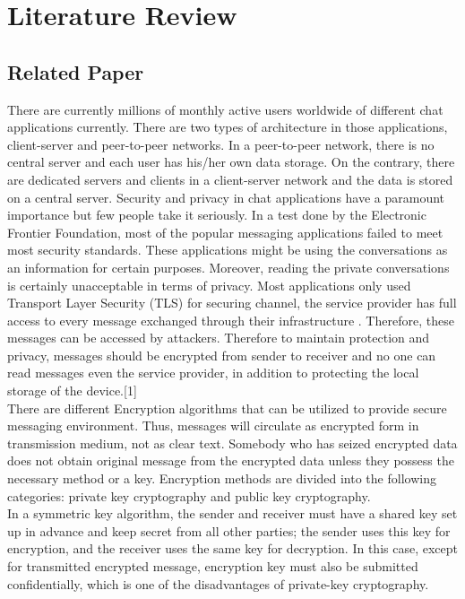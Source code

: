 \chapter{Literature Review}
\section{Related Paper}
There are currently millions of monthly active users worldwide of different chat applications currently. There are two types of architecture in those applications, client-server and peer-to-peer networks. In a peer-to-peer network, there is no central server and each user has his/her own data storage. On the contrary, there are dedicated servers and clients in a client-server network and the data is stored on a central server. Security and privacy in chat applications have a paramount importance but few people take it seriously. In a test done by the Electronic Frontier Foundation, most of the popular messaging applications failed to meet most security standards. These applications might be using the conversations as an information for certain purposes. Moreover, reading the private conversations is certainly unacceptable in terms of privacy.  Most applications only used Transport Layer Security (TLS) for securing channel, the service provider has full access to every message exchanged through their infrastructure . Therefore, these messages can be accessed by attackers. Therefore to maintain protection and privacy, messages should be encrypted from sender to receiver and no one can read messages even the service provider, in addition to protecting the local storage of the device.[1]\\
There are different Encryption algorithms that can  be utilized  to  provide secure  messaging environment. Thus, messages will circulate as  encrypted form in transmission medium, not as clear text. Somebody who has seized encrypted data does not obtain original message from the encrypted  data  unless they  possess  the  necessary  method or  a  key.  Encryption  methods  are divided into the following categories: private key cryptography and public key cryptography.\\
In a symmetric key algorithm, the sender and receiver must have a shared key set up in advance and keep secret from all other parties; the sender uses this key for encryption, and the receiver uses  the  same  key  for  decryption.  In  this  case,  except  for  transmitted  encrypted  message, encryption  key  must  also  be  submitted  confidentially,  which  is  one  of  the  disadvantages of private-key cryptography.
